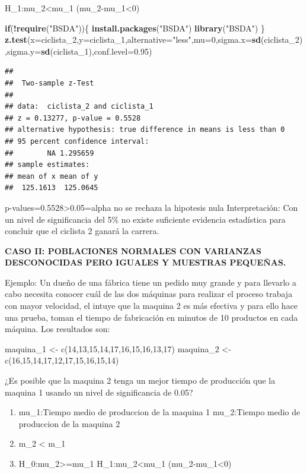 \documentclass[
]{article}
\newenvironment{Shaded}{\begin{snugshade}}{\end{snugshade}}
\newcommand{\AttributeTok}[1]{\textcolor[rgb]{0.13,0.29,0.53}{#1}}
\newcommand{\ControlFlowTok}[1]{\textcolor[rgb]{0.13,0.29,0.53}{\textbf{#1}}}
\newcommand{\DecValTok}[1]{\textcolor[rgb]{0.00,0.00,0.81}{#1}}
\newcommand{\FloatTok}[1]{\textcolor[rgb]{0.00,0.00,0.81}{#1}}
\newcommand{\FunctionTok}[1]{\textcolor[rgb]{0.13,0.29,0.53}{\textbf{#1}}}
\newcommand{\NormalTok}[1]{#1}
\newcommand{\SpecialCharTok}[1]{\textcolor[rgb]{0.81,0.36,0.00}{\textbf{#1}}}
\newcommand{\StringTok}[1]{\textcolor[rgb]{0.31,0.60,0.02}{#1}}
\begin{document}
H\_1:mu\_2\textless mu\_1 (mu\_2-mu\_1\textless0)

\begin{Shaded}
\begin{Highlighting}[]
\ControlFlowTok{if}\NormalTok{(}\SpecialCharTok{!}\FunctionTok{require}\NormalTok{(}\StringTok{"BSDA"}\NormalTok{))\{}
\FunctionTok{install.packages}\NormalTok{(}\StringTok{"BSDA"}\NormalTok{)}
\FunctionTok{library}\NormalTok{(}\StringTok{"BSDA"}\NormalTok{)}
\NormalTok{\}}
\FunctionTok{z.test}\NormalTok{(}\AttributeTok{x=}\NormalTok{ciclista\_2,}\AttributeTok{y=}\NormalTok{ciclista\_1,}\AttributeTok{alternative=}\StringTok{"less"}\NormalTok{,}\AttributeTok{mu=}\DecValTok{0}\NormalTok{,}\AttributeTok{sigma.x=}\FunctionTok{sd}\NormalTok{(ciclista\_2),}\AttributeTok{sigma.y=}\FunctionTok{sd}\NormalTok{(ciclista\_1),}\AttributeTok{conf.level=}\FloatTok{0.95}\NormalTok{)}
\end{Highlighting}
\end{Shaded}

\begin{verbatim}
## 
##  Two-sample z-Test
## 
## data:  ciclista_2 and ciclista_1
## z = 0.13277, p-value = 0.5528
## alternative hypothesis: true difference in means is less than 0
## 95 percent confidence interval:
##        NA 1.295659
## sample estimates:
## mean of x mean of y 
##  125.1613  125.0645
\end{verbatim}

p-values=0.5528\textgreater0.05=alpha no se rechaza la hipotesis nula
Interpretación: Con un nivel de significancia del 5\% no existe
suficiente evidencia estadística para concluir que el ciclista 2 ganará
la carrera.

\textbf{CASO II: POBLACIONES NORMALES CON VARIANZAS DESCONOCIDAS PERO
IGUALES Y MUESTRAS PEQUEÑAS.}

Ejemplo: Un dueño de una fábrica tiene un pedido muy grande y para
llevarlo a cabo necesita conocer cuál de las dos máquinas para realizar
el proceso trabaja con mayor velocidad, el intuye que la maquina 2 es
más efectiva y para ello hace una prueba, toman el tiempo de fabricación
en minutos de 10 productos en cada máquina. Los resultados son:

maquina\_1 \textless- c(14,13,15,14,17,16,15,16,13,17) maquina\_2
\textless- c(16,15,14,17,12,17,15,16,15,14)

¿Es posible que la maquina 2 tenga un mejor tiempo de producción que la
maquina 1 usando un nivel de significancia de 0.05?

\begin{enumerate}
\def\labelenumi{\arabic{enumi}.}
\item
  mu\_1:Tiempo medio de produccion de la maquina 1 mu\_2:Tiempo medio de
  produccion de la maquina 2
\item
  m\_2 \textless{} m\_1
\item
  H\_0:mu\_2\textgreater=mu\_1 H\_1:mu\_2\textless mu\_1
  (mu\_2-mu\_1\textless0)
\end{enumerate}
\end{document}
